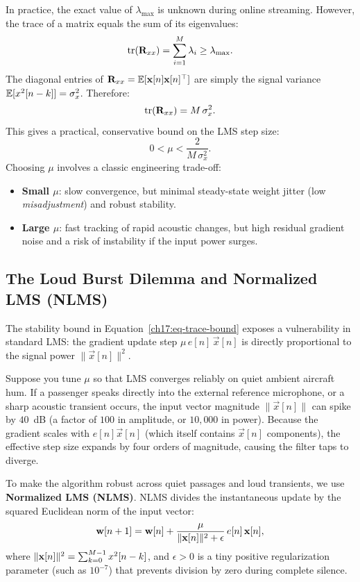 In practice, the exact value of $\lambda_{\max}$ is unknown during online streaming. However, the trace of a matrix equals the sum of its eigenvalues:
\begin{equation}
  \operatorname{tr}(\mathbf{R}_{xx}) = \sum_{i=1}^M \lambda_i \ge \lambda_{\max} .
\end{equation}
The diagonal entries of $\mathbf{R}_{xx} = \operatorname{\mathbb{E}}[\mathbf{x}[n]\mathbf{x}[n]^\top]$ are simply the signal variance $\operatorname{\mathbb{E}}[x^2[n-k]] = \sigma_x^2$. Therefore:
\begin{equation}
  \operatorname{tr}(\mathbf{R}_{xx}) = M\, \sigma_x^2 .
\end{equation}
This gives a practical, conservative bound on the LMS step size:
\begin{equation}
  0 < \mu < \frac{2}{M\, \sigma_x^2} .
  \label{ch17:eq-trace-bound}
\end{equation}
Choosing $\mu$ involves a classic engineering trade-off:
\begin{itemize}
  \item \textbf{Small $\mu$}: slow convergence, but minimal steady-state weight jitter (low \emph{misadjustment}) and robust stability.
  \item \textbf{Large $\mu$}: fast tracking of rapid acoustic changes, but high residual gradient noise and a risk of instability if the input power surges.
\end{itemize}

\subsection{The Loud Burst Dilemma and Normalized LMS (NLMS)}
\label{ch17:nlms}

The stability bound in Equation~\eqref{ch17:eq-trace-bound} exposes a vulnerability in standard LMS: the gradient update step $\mu\, e[n]\, \vec{x}[n]$ is directly proportional to the signal power $\|\vec{x}[n]\|^2$. 

Suppose you tune $\mu$ so that LMS converges reliably on quiet ambient aircraft hum. If a passenger speaks directly into the external reference microphone, or a sharp acoustic transient occurs, the input vector magnitude $\|\vec{x}[n]\|$ can spike by $40$~dB (a factor of $100$ in amplitude, or $10{,}000$ in power). Because the gradient scales with $e[n]\vec{x}[n]$ (which itself contains $\vec{x}[n]$ components), the effective step size expands by four orders of magnitude, causing the filter taps to diverge.

To make the algorithm robust across quiet passages and loud transients, we use \textbf{Normalized LMS (NLMS)}. NLMS divides the instantaneous update by the squared Euclidean norm of the input vector:
\begin{equation}
  \mathbf{w}[n+1] = \mathbf{w}[n] + \frac{\mu}{\lVert\mathbf{x}[n]\rVert^2 + \epsilon}\, e[n]\, \mathbf{x}[n] ,
  \label{ch17:eq-nlms}
\end{equation}
where $\lVert\mathbf{x}[n]\rVert^2 = \sum_{k=0}^{M-1} x^2[n-k]$, and $\epsilon > 0$ is a tiny positive regularization parameter (such as $10^{-7}$) that prevents division by zero during complete silence.

